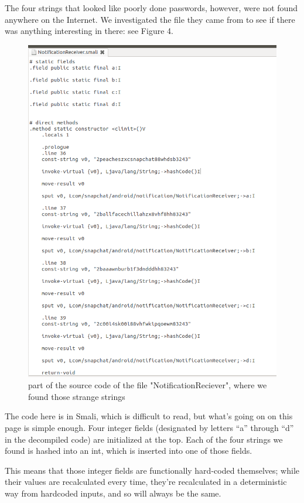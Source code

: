 \documentclass[11pt]{article}
\numberwithin{theorem}{subsection}
\begin{document}
The four strings that looked like poorly done passwords, however, were not found anywhere on the Internet.  We investigated the file
they came from to see if there was anything interesting in there: see Figure 4.

\begin{figure}[H]
  \caption{part of the source code of the file "NotificationReciever", where we found those strange strings}
  \centering
  \includegraphics[scale=0.6]{image4.png}
\end{figure}

The code here is in Smali, which is difficult to read, but what's going on on this page is simple enough.  Four integer fields (designated by
letters ``a'' through ``d'' in the decompiled code) are initialized at the top.  Each of the four strings we found is hashed into an int, which 
is inserted into one of those fields.

This means that those integer fields are functionally hard-coded themselves; while their values are recalculated every time, they're recalculated in a
deterministic way from hardcoded inputs, and so will always be the same.
\end{document}

